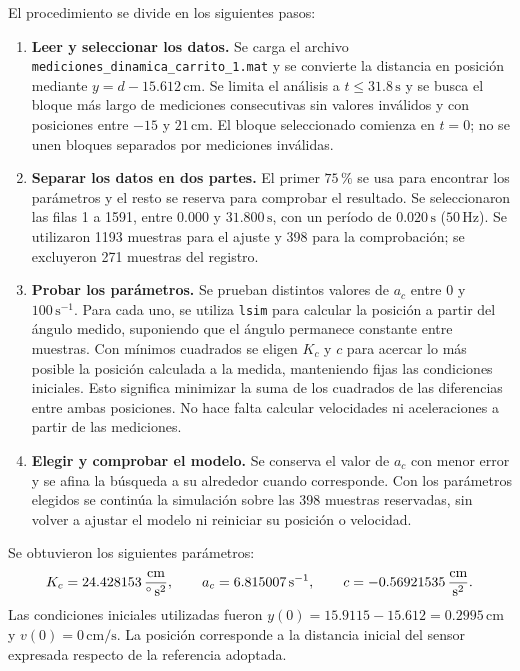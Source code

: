 \documentclass[a4paper, twoside, 10pt, spanish]{article}
\numberwithin{table}{section}
\begin{document}
    El procedimiento se divide en los siguientes pasos:
    \begin{enumerate}
        \item \textbf{Leer y seleccionar los datos.} Se carga el archivo \texttt{mediciones\_dinamica\_carrito\_1.mat} y se convierte la distancia en posición mediante $y=d-15.612\,\text{cm}$. Se limita el análisis a $t\leq31.8\,\text{s}$ y se busca el bloque más largo de mediciones consecutivas sin valores inválidos y con posiciones entre $-15$ y $21\,\text{cm}$. El bloque seleccionado comienza en $t=0$; no se unen bloques separados por mediciones inválidas.
        \item \textbf{Separar los datos en dos partes.} El primer $75\,\%$ se usa para encontrar los parámetros y el resto se reserva para comprobar el resultado. Se seleccionaron las filas 1 a 1591, entre $0.000$ y $31.800\,\text{s}$, con un período de $0.020\,\text{s}$ ($50\,\text{Hz}$). Se utilizaron 1193 muestras para el ajuste y 398 para la comprobación; se excluyeron 271 muestras del registro.
        \item \textbf{Probar los parámetros.} Se prueban distintos valores de $a_c$ entre $0$ y $100\,\text{s}^{-1}$. Para cada uno, se utiliza \texttt{lsim} para calcular la posición a partir del ángulo medido, suponiendo que el ángulo permanece constante entre muestras. Con mínimos cuadrados se eligen $K_c$ y $c$ para acercar lo más posible la posición calculada a la medida, manteniendo fijas las condiciones iniciales. Esto significa minimizar la suma de los cuadrados de las diferencias entre ambas posiciones. No hace falta calcular velocidades ni aceleraciones a partir de las mediciones.
        \item \textbf{Elegir y comprobar el modelo.} Se conserva el valor de $a_c$ con menor error y se afina la búsqueda a su alrededor cuando corresponde. Con los parámetros elegidos se continúa la simulación sobre las 398 muestras reservadas, sin volver a ajustar el modelo ni reiniciar su posición o velocidad.
    \end{enumerate}

    Se obtuvieron los siguientes parámetros:
    \[
        K_c=24.428153\,\frac{\text{cm}}{\degree\,\text{s}^2},\qquad
        a_c=6.815007\,\text{s}^{-1},\qquad
        c=-0.56921535\,\frac{\text{cm}}{\text{s}^2}.
    \]
    Las condiciones iniciales utilizadas fueron $y(0)=15.9115-15.612=0.2995\,\text{cm}$ y $v(0)=0\,\text{cm/s}$. La posición corresponde a la distancia inicial del sensor expresada respecto de la referencia adoptada.
\end{document}
